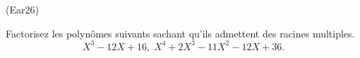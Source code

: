 \begin{tiny}(Ear26)\end{tiny} Factorisez les polynômes suivants sachant qu'ils admettent des racines multiples.
\[
  X^3 - 12X + 16,\;
  X^4 + 2X^3 -11 X^2 -12 X +36.
\]
